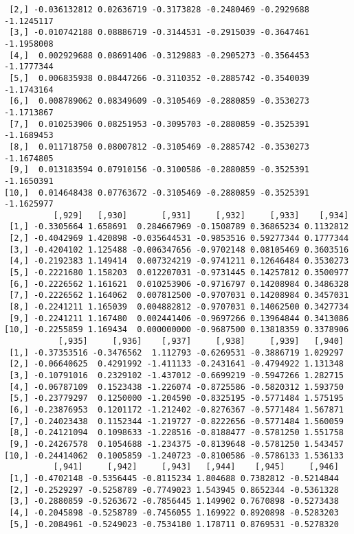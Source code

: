 \documentclass[
  letterpaper,
  DIV=11,
  numbers=noendperiod]{scrreprt}
\begin{document}
\begin{verbatim}
 [2,] -0.036132812 0.02636719 -0.3173828 -0.2480469 -0.2929688 -1.1245117
 [3,] -0.010742188 0.08886719 -0.3144531 -0.2915039 -0.3647461 -1.1958008
 [4,]  0.002929688 0.08691406 -0.3129883 -0.2905273 -0.3564453 -1.1777344
 [5,]  0.006835938 0.08447266 -0.3110352 -0.2885742 -0.3540039 -1.1743164
 [6,]  0.008789062 0.08349609 -0.3105469 -0.2880859 -0.3530273 -1.1713867
 [7,]  0.010253906 0.08251953 -0.3095703 -0.2880859 -0.3525391 -1.1689453
 [8,]  0.011718750 0.08007812 -0.3105469 -0.2885742 -0.3530273 -1.1674805
 [9,]  0.013183594 0.07910156 -0.3100586 -0.2880859 -0.3525391 -1.1650391
[10,]  0.014648438 0.07763672 -0.3105469 -0.2880859 -0.3525391 -1.1625977
          [,929]   [,930]       [,931]     [,932]     [,933]    [,934]
 [1,] -0.3305664 1.658691  0.284667969 -0.1508789 0.36865234 0.1132812
 [2,] -0.4042969 1.420898 -0.035644531 -0.9853516 0.59277344 0.1777344
 [3,] -0.4204102 1.125488 -0.006347656 -0.9702148 0.08105469 0.3603516
 [4,] -0.2192383 1.149414  0.007324219 -0.9741211 0.12646484 0.3530273
 [5,] -0.2221680 1.158203  0.012207031 -0.9731445 0.14257812 0.3500977
 [6,] -0.2226562 1.161621  0.010253906 -0.9716797 0.14208984 0.3486328
 [7,] -0.2226562 1.164062  0.007812500 -0.9707031 0.14208984 0.3457031
 [8,] -0.2241211 1.165039  0.004882812 -0.9707031 0.14062500 0.3427734
 [9,] -0.2241211 1.167480  0.002441406 -0.9697266 0.13964844 0.3413086
[10,] -0.2255859 1.169434  0.000000000 -0.9687500 0.13818359 0.3378906
           [,935]     [,936]    [,937]     [,938]     [,939]   [,940]
 [1,] -0.37353516 -0.3476562  1.112793 -0.6269531 -0.3886719 1.029297
 [2,] -0.06640625  0.4291992 -1.411133 -0.2431641 -0.4794922 1.131348
 [3,] -0.10791016  0.2329102 -1.437012 -0.6699219 -0.5947266 1.282715
 [4,] -0.06787109  0.1523438 -1.226074 -0.8725586 -0.5820312 1.593750
 [5,] -0.23779297  0.1250000 -1.204590 -0.8325195 -0.5771484 1.575195
 [6,] -0.23876953  0.1201172 -1.212402 -0.8276367 -0.5771484 1.567871
 [7,] -0.24023438  0.1152344 -1.219727 -0.8222656 -0.5771484 1.560059
 [8,] -0.24121094  0.1098633 -1.228516 -0.8188477 -0.5781250 1.551758
 [9,] -0.24267578  0.1054688 -1.234375 -0.8139648 -0.5781250 1.543457
[10,] -0.24414062  0.1005859 -1.240723 -0.8100586 -0.5786133 1.536133
          [,941]     [,942]     [,943]   [,944]    [,945]     [,946]
 [1,] -0.4702148 -0.5356445 -0.8115234 1.804688 0.7382812 -0.5214844
 [2,] -0.2529297 -0.5258789 -0.7749023 1.543945 0.8652344 -0.5361328
 [3,] -0.2880859 -0.5263672 -0.7856445 1.149902 0.7670898 -0.5273438
 [4,] -0.2045898 -0.5258789 -0.7456055 1.169922 0.8920898 -0.5283203
 [5,] -0.2084961 -0.5249023 -0.7534180 1.178711 0.8769531 -0.5278320

\end{verbatim}
\end{document}
